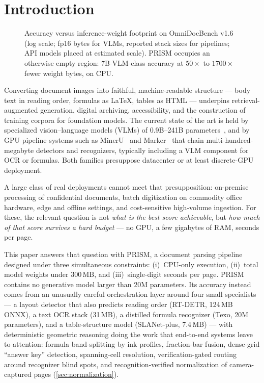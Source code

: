 \section{Introduction}
\label{sec:intro}

\begin{figure}[t]
  \centering
  
  \caption{Accuracy versus inference-weight footprint on OmniDocBench v1.6 (log scale; fp16 bytes for VLMs, reported stack sizes for pipelines; API models placed at estimated scale). PRISM occupies an otherwise empty region: 7B-VLM-class accuracy at $50\times$ to $1700\times$ fewer weight bytes, on CPU.}
  \label{fig:frontier}
\end{figure}

Converting document images into faithful, machine-readable structure --- body text in reading order, formulas as \LaTeX{}, tables as HTML --- underpins retrieval-augmented generation, digital archiving, accessibility, and the construction of training corpora for foundation models. The current state of the art is held by specialized vision--language models (VLMs) of 0.9B--241B parameters~\cite{paddleocrvl,mineru25,glmocr}, and by GPU pipeline systems such as MinerU~\cite{mineru} and Marker~\cite{marker} that chain multi-hundred-megabyte detectors and recognizers, typically including a VLM component for OCR or formulas. Both families presuppose datacenter or at least discrete-GPU deployment.

A large class of real deployments cannot meet that presupposition: on-premise processing of confidential documents, batch digitization on commodity office hardware, edge and offline settings, and cost-sensitive high-volume ingestion. For these, the relevant question is not \emph{what is the best score achievable}, but \emph{how much of that score survives a hard budget} --- no GPU, a few gigabytes of RAM, seconds per page.

This paper answers that question with PRISM, a document parsing pipeline designed under three simultaneous constraints: (i)~CPU-only execution, (ii)~total model weights under 300\,MB, and (iii)~single-digit seconds per page. PRISM contains no generative model larger than 20M parameters. Its accuracy instead comes from an unusually careful orchestration layer around four small specialists --- a layout detector that also predicts reading order (RT-DETR, 124\,MB ONNX), a text OCR stack (31\,MB), a distilled formula recognizer (Texo, 20M parameters), and a table-structure model (SLANet-plus, 7.4\,MB) --- with deterministic geometric reasoning doing the work that end-to-end systems leave to attention: formula band-splitting by ink profiles, fraction-bar fusion, dense-grid ``answer key'' detection, spanning-cell resolution, verification-gated routing around recognizer blind spots, and recognition-verified normalization of camera-captured pages (\cref{sec:normalization}).


